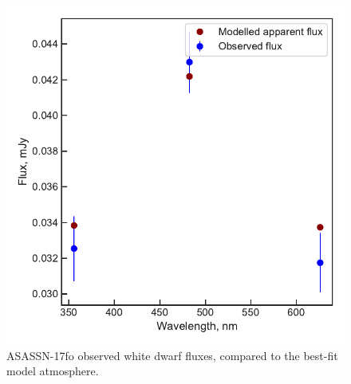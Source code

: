 \begin{figure}
    \centering
    \includegraphics[width=\textwidth]{figures/results/ASASSN-17fo/fluxplot.pdf}
    \caption{ASASSN-17fo observed white dwarf fluxes, compared to the best-fit model atmosphere.}
    \label{fig:ASASSN-17fo flux plot}
\end{figure}
\clearpage


